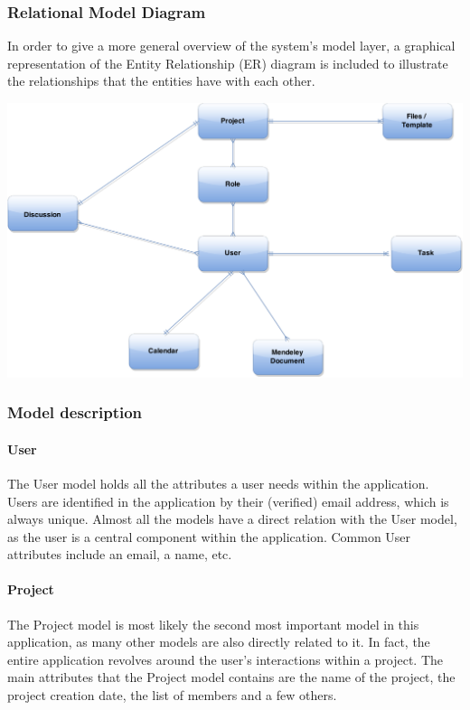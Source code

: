 \subsubsection{Relational Model Diagram}
In order to give a more general overview of the system's model layer, a graphical representation of the Entity Relationship (ER) diagram is included to illustrate the relationships that the entities have with each other.

\begin{center}
\includegraphics[scale=0.3]{./img/dsgn_img/RMA.png}
	
\end{center}

\subsubsection{Model description}
\paragraph{User}
The User model holds all the attributes a user needs within the application. Users are identified in the application by their (verified) email address, which is always unique. Almost all the models have a direct relation with the User model, as the user is a central component within the application. Common User attributes include an email, a name, etc.

\paragraph{Project}

The Project model is most likely the second most important model in this application, as many other models are also directly related to it. In fact, the entire application revolves around the user's interactions within a project. The main attributes that the Project model contains are the name of the project, the project creation date, the list of members and a few others.

